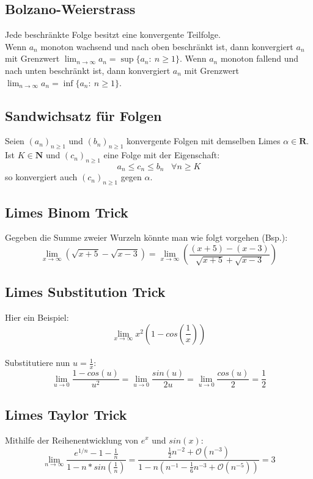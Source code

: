 \documentclass[8pt]{extarticle}
\def\limn{\lim_{n\to \infty}}
\begin{document}
\begin{multicols*}{3}
 \subsection{Bolzano-Weierstrass}
Jede beschränkte Folge besitzt eine konvergente Teilfolge.\\
Wenn $a_n$ monoton wachsend und nach oben beschränkt ist, dann konvergiert $a_n$ mit Grenzwert $\limn a_n = \sup \{a_n : \ n \ge 1\}$.
Wenn $a_n$ monoton fallend und nach unten beschränkt ist, dann konvergiert $a_n$ mit Grenzwert $\limn a_n = \inf \{a_n : \ n \ge 1\}$.


  \subsection {Sandwichsatz für Folgen}
Seien $(a_n)_{n \geq 1}$ und $(b_n)_{n \geq 1}$ konvergente Folgen mit demselben Limes
$\alpha \in \mathbf{R}$. Ist $K \in \mathbf{N}$ und $(c_n)_{n \geq 1}$ eine Folge
mit der Eigenschaft: $$a_n \leq c_n \leq b_n \; \; \; \forall n \geq K$$ so konvergiert
auch $(c_n)_{n \geq 1}$ gegen $\alpha$.
  \subsection{Limes Binom Trick}
Gegeben die Summe zweier Wurzeln könnte man wie folgt
vorgehen (Bsp.):
$$
  \lim_{x \rightarrow \infty} (\sqrt{x + 5} - \sqrt{x - 3}) = \lim_{x \rightarrow \infty} (\frac{(x + 5) - (x - 3)}{\sqrt{x + 5} + \sqrt{x - 3}})
$$
  \subsection{Limes Substitution Trick}
Hier ein Beispiel:
$$
  \lim_{x \rightarrow \infty} x^2 (1 - cos(\frac{1}{x}))
$$\\
Substitutiere nun $u = \frac{1}{x}$:
$$
\lim_{u \rightarrow 0} \frac{1 - cos(u)}{u^2} = \lim_{u \rightarrow 0} \frac{sin(u)}{2u} = \lim_{u \rightarrow 0} \frac{cos(u)}{2} = \frac{1}{2}
$$

  \subsection{Limes Taylor Trick}

Mithilfe der Reihenentwicklung von $e^x$ und $sin(x)$:
$$
\lim_{n \rightarrow \infty} \frac{e^{1/n} - 1 - \frac{1}{n}}{1 - n * sin(\frac{1}{n})} = \frac{\frac{1}{2}n^{-2} + \mathcal{O}(n^{-3})}{1 - n(n^{-1} - \frac{1}{6}n^{-3} + \mathcal{O}(n^{-5}))} = 3
$$

\end{multicols*}
\end{document}
